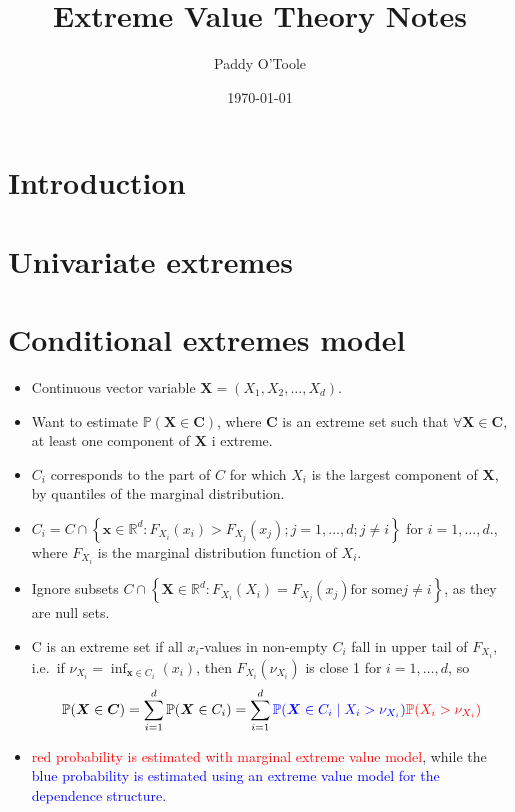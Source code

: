 \documentclass{article}
\title{Extreme Value Theory Notes}
\author{Paddy O'Toole}
\date{\today}
\begin{document}
\maketitle

\tableofcontents



\section{Introduction}\label{sec:intro}

\section{Univariate extremes}\label{sec:uni}

\section{Conditional extremes model}\label{sec:ce}


\begin{itemize} 
  \item Continuous vector variable $\bm{X} = (X_1, X_2, \ldots, X_d)$. 
  \item Want to estimate $\mathbb{P}(\bm{X} \in \bm{C})$, where $\bm{C}$ is an extreme set such that $\forall \bm{X} \in \bm{C}$, at least one component of $\bm{X}$ i extreme. 
  \item $C_i$ corresponds to the part of $C$ for which $X_i$ is the largest component of $\bm{X}$, by quantiles of the marginal distribution. 
  \item $C_i = C \cap \left\{ \bm{x} \in \mathbb{R}^d: F_{X_i}(x_i) > F_{X_j}(x_j); j = 1, \ldots, d; j \ne i \right\}$ for $i = 1, \ldots, d$., where $F_{X_i}$ is the marginal distribution function of $X_i$.
  \item Ignore subsets $C \cap \left\{ \bm{X} \in \mathbb{R}^d: F_{X_i}(X_i) = F_{X_j}(x_j) \text{for some} j \ne i \right\}$, as they are null sets. 
  \item C is an extreme set if all $x_i$-values in non-empty $C_i$ fall in upper tail of $F_{X_i}$, i.e.\ if $\nu_{X_i} = \inf_{\bm{x} \in C_i}{(x_i)}$, then $F_{X_i}(\nu_{X_i})$ is close 1 for $i = 1, \ldots, d$, so 
  \[
  \mathbb{P}(\bm{X} \in \bm{C}) = \sum_{i=1}^{d}{\mathbb{P}(\bm{X} \in C_i)} = \sum_{i=1}^{d}\textcolor{blue}{\mathbb{P}(\bm{X} \in C_i\mid X_i > \nu_{X_i})}\textcolor{red}{\mathbb{P}(X_i> \nu_{X_i})}
  \]
  \item \textcolor{red}{red probability is estimated with marginal extreme value model}, while the \textcolor{blue}{blue probability is estimated using an extreme value model for the dependence structure}. 
\end{itemize}
\end{document}
